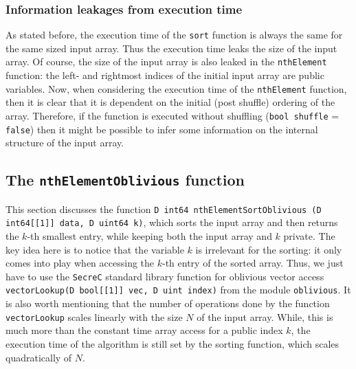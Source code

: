 \documentclass[11pt]{article}
\newcommand{\ct}[1]{\texttt{#1}}
\newcommand{\SC}{\ct{SecreC}\xspace}
\begin{document}

\subsubsection{Information leakages from execution time} %
\label{ssub:information_leakages_from_execution_time}

As stated before, the execution time of the \ct{sort} function is always the same for the same sized input array. Thus the execution time leaks the size of the input array. Of course, the size of the input array is also leaked in the \ct{nthElement} function: the left- and rightmost indices of the initial input array are public variables. Now, when considering the execution time of the \ct{nthElement} function, then it is clear that it is dependent on the initial (post shuffle) ordering of the array. Therefore, if the function is executed without shuffling (\ct{bool shuffle} = \ct{false}) then it might be possible to infer some information on the internal structure of the input array.      



\subsection{The \ct{nthElementOblivious} function} %
\label{sub:the_nthelementoblivious_function}

This section discusses the function \ct{D int64 nthElementSortOblivious (D int64[[1]] data, D uint64 k)}, which sorts the input array and then returns the $k$-th smallest entry, while keeping both the input array and $k$ private. The key idea here is to notice that the variable $k$ is irrelevant for the sorting: it only comes into play when accessing the $k$-th entry of the sorted array. Thus, we just have to use the \SC standard library function for oblivious vector access \ct{vectorLookup(D bool[[1]] vec, D uint index)} from the module \ct{oblivious}. It is also worth mentioning that the number of operations done by the function \ct{vectorLookup} scales linearly with the size $N$ of the input array. While, this is much more than the constant time array access for a public index $k$, the execution time of the algorithm is still set by the sorting function, which scales quadratically of $N$.
\end{document}
